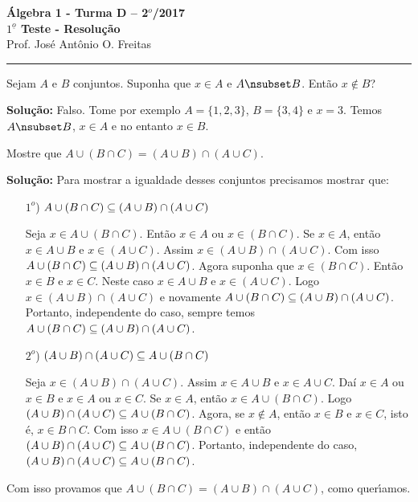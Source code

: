 \documentclass[12pt]{article}
\begin{document}


\begin{center}
{\Large\bf {\'A}lgebra 1 - Turma D -- 2$^{o}$/2017} \\ \vspace{9pt} {\large\bf
  $1^{\underline{o}}$ Teste - Resolu\c{c}\~ao}\\
\vspace{9pt} Prof. Jos{\'e} Ant{\^o}nio O. Freitas
\end{center}
\hrule

\vspace{.6cm}


\vspace{.6cm}

\questao Sejam $A$ e $B$ conjuntos. Suponha que $x \in A$ e $A \nsub B$. Então $x \notin B$?

\noindent\textbf{Solu\c{c}\~ao:} Falso. Tome por exemplo $A = \{1,2,3\}$, $B = \{3,4\}$ e $x = 3$. Temos $A \nsub B$, $x \in A$ e no entanto $x \in B$.

\vspace{.5cm}

\questao Mostre que $A \cup ( B \cap C) = (A \cup B) \cap (A \cup C)$.

\noindent\textbf{Solu\c{c}\~ao:} Para mostrar a igualdade desses conjuntos precisamos mostrar que:
\begin{enumerate}
	\item [$1^o$)] $A \cup ( B \cap C) \subseteq (A \cup B) \cap (A \cup C)$

	Seja $x \in A \cup ( B \cap C)$. Ent\~ao $x \in A$ ou $x \in (B \cap C)$. Se $x \in A$, ent\~ao $x \in A \cup B$ e $x \in (A \cup C)$. Assim $x \in (A \cup B) \cap (A \cup C)$. Com isso $A \cup ( B \cap C) \subseteq (A \cup B) \cap (A \cup C)$. Agora suponha que $x \in (B \cap C)$. Ent\~ao $x \in B$ e $x \in C$. Neste caso $x \in A \cup B$ e $x \in (A \cup C)$. Logo $x \in (A \cup B) \cap (A \cup C)$ e novamente $A \cup ( B \cap C) \subseteq (A \cup B) \cap (A \cup C)$. Portanto, independente do caso, sempre temos $A \cup ( B \cap C) \subseteq (A \cup B) \cap (A \cup C)$.

	\item [$2^o$)] $(A \cup B) \cap (A \cup C) \subseteq A \cup ( B \cap C)$

	Seja $x \in (A \cup B) \cap (A \cup C)$. Assim $x \in A \cup B$ e $x \in A \cup C$. Daí $x \in A$ ou $x \in B$ e $x \in A$ ou $x \in C$. Se $x \in A$, então $x \in A \cup (B \cap C)$. Logo $(A \cup B) \cap (A \cup C) \subseteq A \cup ( B \cap C)$. Agora, se $x \notin A$, então $x \in B$ e $x \in C$, isto é, $x \in B \cap C$. Com isso $x \in A \cup (B \cap C)$ e então $(A \cup B) \cap (A \cup C) \subseteq A \cup ( B \cap C)$. Portanto, independente do caso, $(A \cup B) \cap (A \cup C) \subseteq A \cup ( B \cap C)$.
\end{enumerate}
Com isso provamos que $A \cup ( B \cap C) = (A \cup B) \cap (A \cup C)$, como quer{\'\i}amos.
\end{document}
